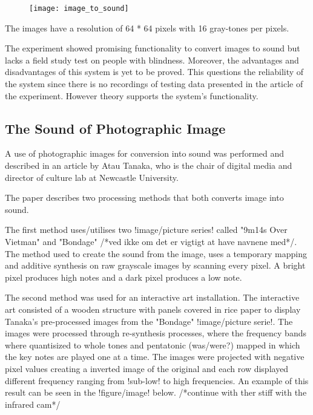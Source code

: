 \begin{figure}[!h] 
\centering
\texttt{[image: image\_to\_sound]}
\caption{\label{fig:image_to_sound}}
\end{figure}
  
The images have a resolution of 64 * 64 pixels with 16 gray-tones per pixels.  

The experiment showed promising functionality to convert images to sound but lacks a field study test on people with blindness. Moreover, the advantages and disadvantages of this system is yet to be proved. This questions the reliability of the system since there is no recordings of testing data presented in the article of the experiment. However theory supports the system's functionality. 

\subsection{The Sound of Photographic Image}\label{sec:soundarticle}

A use of photographic images for conversion into sound was performed and described in an article by Atau Tanaka, who is the chair of digital media and director of culture lab at Newcastle University.

The paper describes two processing methods that both converts image into sound.

The first method uses/utilises two !image/picture series! called "9m14s Over Vietman" and "Bondage" /*ved ikke om det er vigtigt at have navnene med*/. The method used to create the sound from the image, uses a temporary mapping and additive synthesis on raw grayscale images by scanning every pixel. A bright pixel produces high notes and a dark pixel produces a low note.

The second method was used for an interactive art installation. The interactive art consisted of a wooden structure with panels covered in rice paper to display Tanaka's pre-processed images from the "Bondage" !image/picture serie!. The images were processed through re-synthesis processes, where the frequency bands where quantisized to whole tones and pentatonic (was/were?) mapped in which the key notes are played one at a time. The images were projected with negative pixel values creating a inverted image of the original and each row displayed different frequency ranging from !sub-low! to high frequencies. An example of this result can be seen in the !figure/image! below. /*continue with ther stiff with the infrared cam*/


